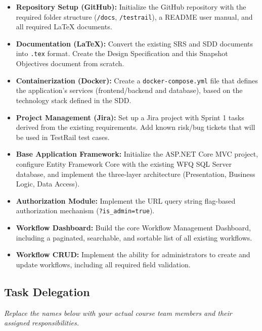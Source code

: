 \documentclass[12pt]{article}
\begin{document}
\begin{itemize}
    \item \textbf{Repository Setup (GitHub):} Initialize the GitHub repository with the
    required folder structure (\texttt{/docs}, \texttt{/testrail}), a README user manual,
    and all required LaTeX documents.

    \item \textbf{Documentation (LaTeX):} Convert the existing SRS and SDD documents into
    \texttt{.tex} format. Create the Design Specification and this Snapshot Objectives
    document from scratch.

    \item \textbf{Containerization (Docker):} Create a \texttt{docker-compose.yml} file
    that defines the application's services (frontend/backend and database), based on the
    technology stack defined in the SDD.

    \item \textbf{Project Management (Jira):} Set up a Jira project with Sprint 1 tasks
    derived from the existing requirements. Add known risk/bug tickets that will be used
    in TestRail test cases.

    \item \textbf{Base Application Framework:} Initialize the ASP.NET Core MVC project,
    configure Entity Framework Core with the existing WFQ SQL Server database, and
    implement the three-layer architecture (Presentation, Business Logic, Data Access).

    \item \textbf{Authorization Module:} Implement the URL query string flag-based
    authorization mechanism (\texttt{?is\_admin=true}).

    \item \textbf{Workflow Dashboard:} Build the core Workflow Management Dashboard,
    including a paginated, searchable, and sortable list of all existing workflows.

    \item \textbf{Workflow CRUD:} Implement the ability for administrators to create and
    update workflows, including all required field validation.
\end{itemize}

\subsection{Task Delegation}

\textit{Replace the names below with your actual course team members and their assigned
responsibilities.}
\end{document}
